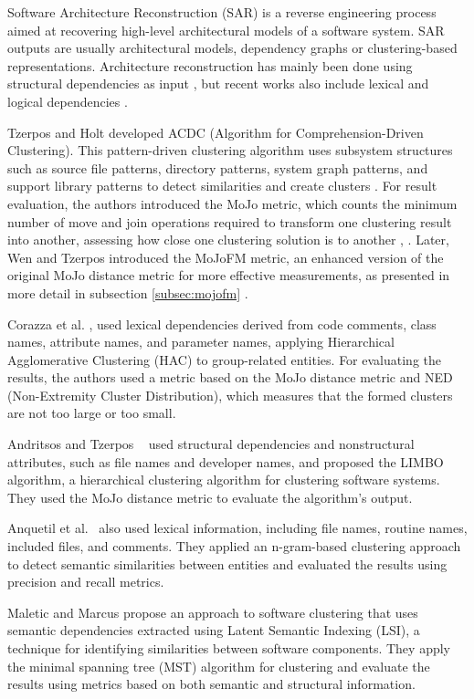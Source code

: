 Software Architecture Reconstruction (SAR) is a reverse engineering process aimed at recovering high-level architectural models of a software system. SAR outputs are usually architectural models, dependency graphs or clustering-based representations. Architecture reconstruction has mainly been done using structural dependencies as input \cite{sar, sar-2007, PagerankENASE, Bass-archreconstruction, Capiluppi-semantic-dep}, but recent works also include lexical and logical dependencies \cite{lexical-dep, corazza2, maletic}. 

Tzerpos and Holt developed ACDC (Algorithm for Comprehension-Driven Clustering). This pattern-driven clustering algorithm uses subsystem structures such as source file patterns, directory patterns, system graph patterns, and support library patterns to detect similarities and create clusters \cite{acdc}. For result evaluation, the authors introduced the MoJo metric, which counts the minimum number of move and join operations required to transform one clustering result into another, assessing how close one clustering solution is to another \cite{b3}, \cite{tzerpos1}. Later, Wen and Tzerpos introduced the MoJoFM metric, an enhanced version of the original MoJo distance metric for more effective measurements, as presented in more detail in subsection \ref{subsec:mojofm} \cite{mojofm}.

Corazza et al. \cite{lexical-dep}, \cite{corazza2} used lexical dependencies derived from code comments, class names, attribute names, and parameter names, applying Hierarchical Agglomerative Clustering (HAC) to group-related entities. For evaluating the results, the authors used a metric based on the MoJo distance metric and NED (Non-Extremity Cluster Distribution), which measures that the formed clusters are not too large or too small.

Andritsos and Tzerpos ~\cite{tzerpos1} used structural dependencies and nonstructural attributes, such as file names and developer names, and proposed the LIMBO algorithm, a hierarchical clustering algorithm for clustering software systems. They used the MoJo distance metric to evaluate the algorithm's output.

Anquetil et al.~\cite{b14} also used lexical information, including file names, routine names, included files, and comments. They applied an n-gram-based clustering approach to detect semantic similarities between entities and evaluated the results using precision and recall metrics.

Maletic and Marcus \cite{maletic} propose an approach to software clustering that uses semantic dependencies extracted using Latent Semantic Indexing (LSI), a technique for identifying similarities between software components. They apply the minimal spanning tree (MST) algorithm for clustering and evaluate the results using metrics based on both semantic and structural information.

